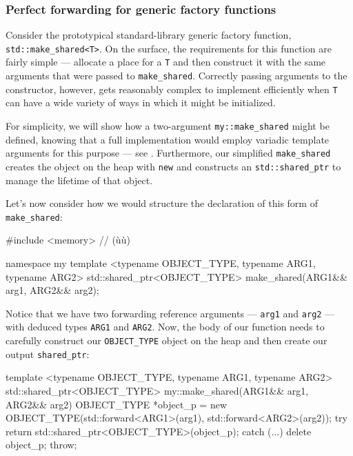 \subsubsection[Perfect forwarding for generic factory functions]{Perfect forwarding for generic factory functions}\label{perfect-forwarding-for-generic-factory-functions}

Consider the prototypical standard-library generic factory function,
\lstinline!std::make_shared<T>!. On the surface, the requirements for this
function are fairly simple --- allocate a place for a \lstinline!T! and
then construct it with the same arguments that were passed to
\lstinline!make_shared!. Correctly passing arguments to the constructor, however, gets reasonably complex to
implement efficiently when \lstinline!T! can have a wide variety of ways in
which it might be initialized.

For simplicity, we will show how a two-argument \lstinline!my::make_shared!
might be defined, knowing that a full implementation would employ
variadic template arguments for this purpose --- see .
Furthermore, our simplified \lstinline!make_shared! creates the object on the
heap with \lstinline!new! and constructs an \lstinline!std::shared_ptr! to
manage the lifetime of that object.

Let's now consider how we would structure the declaration of this form of \lstinline!make_shared!:

\begin{emcppshiddenlisting}[emcppsbatch=e9]
#include <memory>  // (ù{}ù)
\end{emcppshiddenlisting}
\begin{emcppslisting}[emcppsbatch=e9]
namespace my {
template <typename OBJECT_TYPE, typename ARG1, typename ARG2>
std::shared_ptr<OBJECT_TYPE> make_shared(ARG1&& arg1, ARG2&& arg2);
}
\end{emcppslisting}

\noindent Notice that we have two forwarding reference arguments ---
\lstinline!arg1! and \lstinline!arg2! --- with deduced types \lstinline!ARG1! and
\lstinline!ARG2!. Now, the body of our function needs to carefully
construct our \lstinline!OBJECT_TYPE! object on the heap and then create
our output \lstinline!shared_ptr!:

\begin{emcppslisting}[emcppsbatch=e9]
template <typename OBJECT_TYPE, typename ARG1, typename ARG2>
std::shared_ptr<OBJECT_TYPE> my::make_shared(ARG1&& arg1, ARG2&& arg2)
{
    OBJECT_TYPE *object_p = new OBJECT_TYPE(std::forward<ARG1>(arg1),
                                               std::forward<ARG2>(arg2));
    try
    {
        return std::shared_ptr<OBJECT_TYPE>(object_p);
    }
    catch (...)
    {
        delete object_p;
        throw;
    }
}
\end{emcppslisting}

